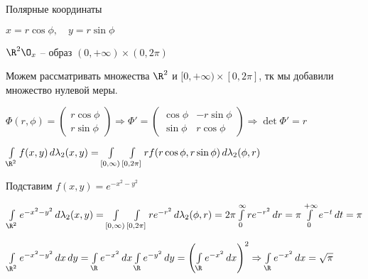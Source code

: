 \begin{example}
	Полярные координаты 
	
	$x = r \cos \phi, \quad y = r \sin \phi$
	
	$\R^2 \O_x$ -- образ $(0, +\infty) \times (0, 2\pi)$
	
	Можем рассматривать множества $\R^2$ и $[0, +\infty) \times [0, 2\pi]$, тк мы добавили множество нулевой меры.
	
	$\Phi(r, \phi) = \begin{pmatrix}
	r \cos \phi \\
	r \sin \phi
	\end{pmatrix} \Rightarrow \Phi' = \begin{pmatrix}
	\cos \phi & - r\sin\phi\\
	\sin \phi & r\cos \phi
	\end{pmatrix} \Rightarrow \det \Phi' = r$
	
	$\int\limits_{\R^2} f(x, y) \,d\lambda_2(x, y) = \int\limits_{[0, \infty)} \int\limits_{[0, 2\pi]} r f(r\cos \phi, r \sin \phi) \,d\lambda_2(\phi, r)$
	
	Подставим $f(x, y) = e^{-x^2-y^2}$

	$\int\limits_{\R^2} e^{-x^2-y^2} \,d\lambda_2(x, y) = \int\limits_{[0, \infty)} \int\limits_{[0, 2\pi]} r e^{-r^2} \,d\lambda_2(\phi, r) = 2\pi \int\limits_0^\infty r e^{-r^2} \,dr = \pi \int\limits_{0}^{+\infty} e^{-t}\,dt = \pi$
	
	$\int\limits_{\R^2} e^{-x^2-y^2} \,dx\,dy = \int\limits_{\R} e^{-x^2} \,dx \int\limits_{\R} e^{-y^2} \,dy = \left(\int\limits_{\R} e^{-x^2} \,dx \right)^2 \Rightarrow\int\limits_{\R} e^{-x^2} \,dx = \sqrt{\pi}$

\end{example}
